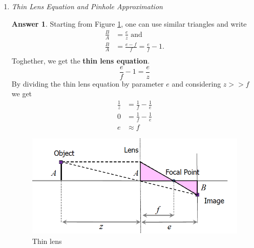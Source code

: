 \documentclass[a4paper,12 pt]{article}
\theoremstyle{definition}
\theoremstyle{remark}
\theoremstyle{definition}
\theoremstyle{definition}
\theoremstyle{definition}
\theoremstyle{definition}
\theoremstyle{remark}
\theoremstyle{remark}
\theoremstyle{definition}
\theoremstyle{definition}
\newtheorem*{answer}{Answer}
\begin{document}
\begin{enumerate}
\item \textit{Thin Lens Equation and Pinhole Approximation}
\begin{answer}
Starting from Figure \ref{fig:focal}, one can use similar triangles and write
\begin{equation}
\begin{split}
\frac{B}{A}&=\frac{e}{z} \text{ and}\\
\frac{B}{A}&=\frac{e-f}{f}=\frac{e}{f}-1.\\
\end{split}
\end{equation}
Toghether, we get the \textbf{thin lens equation}.
\begin{equation}
\frac{e}{f}-1=\frac{e}{z}
\end{equation}
By dividing the thin lens equation by parameter $e$ and considering $z>>f$ we get
\begin{equation}
\begin{split}
\frac{1}{z}&=\frac{1}{f}-\frac{1}{e}\\
0&=\frac{1}{f}-\frac{1}{e}\\
e&\approx f
\end{split}
\end{equation}

\begin{figure}[h!]
\begin{center}
\includegraphics[scale=0.5]{pics/focal}
\caption{Thin lens \label{fig:focal}}
\end{center}
\end{figure}
\end{answer}


\end{enumerate}
\end{document}
